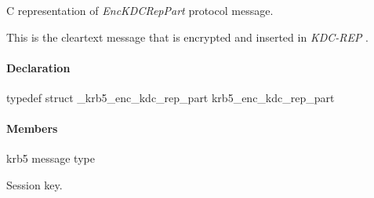 \documentclass[letterpaper,10pt,english]{sphinxmanual}
\begin{document}
\begin{fulllineitems}
\label{appdev/refs/types/krb5_enc_kdc_rep_part:krb5_enc_kdc_rep_part}
\end{fulllineitems}


C representation of \emph{EncKDCRepPart} protocol message.

This is the cleartext message that is encrypted and inserted in \emph{KDC-REP} .


\paragraph{Declaration}
\label{appdev/refs/types/krb5_enc_kdc_rep_part:declaration}
typedef struct \_krb5\_enc\_kdc\_rep\_part  krb5\_enc\_kdc\_rep\_part


\paragraph{Members}
\label{appdev/refs/types/krb5_enc_kdc_rep_part:members}

\begin{fulllineitems}
\label{appdev/refs/types/krb5_enc_kdc_rep_part:krb5_enc_kdc_rep_part.magic}
\end{fulllineitems}


\begin{fulllineitems}
\label{appdev/refs/types/krb5_enc_kdc_rep_part:krb5_enc_kdc_rep_part.msg_type}
krb5 message type

\end{fulllineitems}


\begin{fulllineitems}
\label{appdev/refs/types/krb5_enc_kdc_rep_part:krb5_enc_kdc_rep_part.session}
Session key.

\end{fulllineitems}
\end{document}
